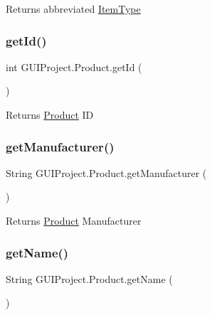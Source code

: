 \begin{DoxyReturn}{Returns}
abbreviated \mbox{\hyperlink{enum_g_u_i_project_1_1_item_type}{Item\+Type}} 
\end{DoxyReturn}
\mbox{\label{class_g_u_i_project_1_1_product_ae72a50e7c9256c8ffef8c39809d99433}} 
\subsubsection{\texorpdfstring{getId()}{getId()}}
{\footnotesize\ttfamily int G\+U\+I\+Project.\+Product.\+get\+Id (\begin{DoxyParamCaption}{ }\end{DoxyParamCaption})}

\begin{DoxyReturn}{Returns}
\mbox{\hyperlink{class_g_u_i_project_1_1_product}{Product}} ID 
\end{DoxyReturn}
\mbox{\label{class_g_u_i_project_1_1_product_a61fcfd8cc11264f1a31b5c16c18b77ce}} 
\subsubsection{\texorpdfstring{getManufacturer()}{getManufacturer()}}
{\footnotesize\ttfamily String G\+U\+I\+Project.\+Product.\+get\+Manufacturer (\begin{DoxyParamCaption}{ }\end{DoxyParamCaption})}

\begin{DoxyReturn}{Returns}
\mbox{\hyperlink{class_g_u_i_project_1_1_product}{Product}} Manufacturer 
\end{DoxyReturn}
\mbox{\label{class_g_u_i_project_1_1_product_a5d2fc659a459cf83065eaea96e37a3fe}} 
\subsubsection{\texorpdfstring{getName()}{getName()}}
{\footnotesize\ttfamily String G\+U\+I\+Project.\+Product.\+get\+Name (\begin{DoxyParamCaption}{ }\end{DoxyParamCaption})}

